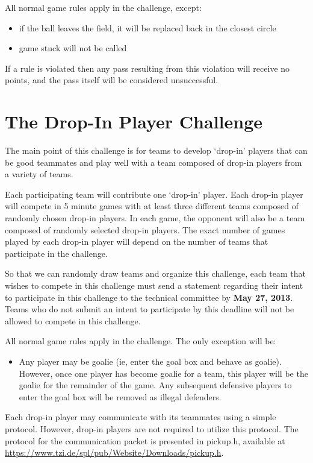 \documentclass{article}
\begin{document}
All normal game rules apply in the challenge, except:
\begin{itemize}
\item if the ball leaves the field, it will be replaced back in the closest circle
\item game stuck will not be called
\end{itemize}

If a rule is violated then any pass resulting from this violation will receive no points, and the pass itself will be considered unsuccessful.


\section{The Drop-In Player Challenge}
\label{sec:dropIn}
The main point of this challenge is for teams to develop `drop-in' players that can be good teammates and play well with a team composed of drop-in players from a variety of teams.

Each participating team will contribute one `drop-in' player.  Each drop-in player will compete in 5 minute games with at least three different teams composed of randomly chosen drop-in players.  In each game, the opponent will also be a team composed of randomly selected drop-in players.  The exact number of games played by each drop-in player will depend on the number of teams that participate in the challenge.

So that we can randomly draw teams and organize this challenge, each team that wishes to compete in this challenge must send a statement regarding their intent to participate in this challenge to the technical committee by \textbf{May 27, 2013}.  Teams who do not submit an intent to participate by this deadline will not be allowed to compete in this challenge.

All normal game rules apply in the challenge.  The only exception will be:
\begin{itemize}
\item Any player may be goalie (ie, enter the goal box and behave as goalie).  However, once one player has become goalie for a team, this player will be the goalie for the remainder of the game.  Any subsequent defensive players to enter the goal box will be removed as illegal defenders.
\end{itemize}

Each drop-in player may communicate with its teammates using a simple protocol.  However, drop-in players are not required to utilize this protocol.  The protocol for the communication packet is presented in pickup.h, available at \url{https://www.tzi.de/spl/pub/Website/Downloads/pickup.h}.
\end{document}

